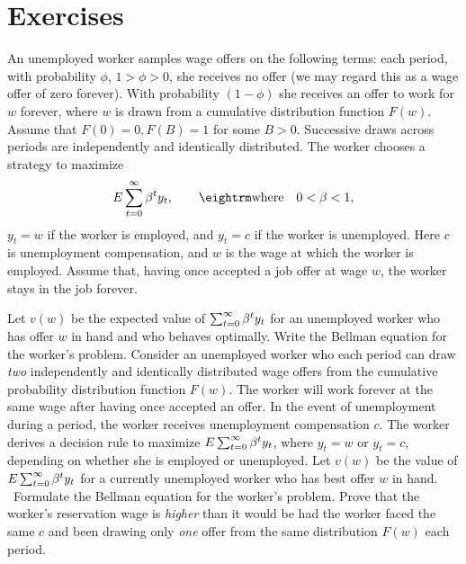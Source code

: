 \showchaptIDfalse
\showsectIDfalse
\section{Exercises}
\showchaptIDtrue
\showsectIDtrue
\medskip
{}
\medskip
\noindent An unemployed worker samples wage offers on the following terms:  each period,
with probability $\phi$, $1>\phi>0$, she receives no offer (we may regard this
as a wage offer of zero forever).  With probability $(1-\phi)$ she receives an
offer to work for $w$ forever, where $w$ is drawn from a cumulative
distribution function $F(w)$. Assume that $F(0) = 0, F(B) =1$ for some $B >0$.   Successive draws across periods are
independently and identically distributed.  The worker chooses a strategy to
maximize
$$E\sum_{t=0}^\infty \be^t y_t,\qquad {\rm where}\quad 0<\be<1,$$
$y_t=w$ if the worker is employed, and $y_t=c$ if the worker is unemployed.
Here $c$ is unemployment compensation, and $w$ is the wage at which the worker
is employed.  Assume that, having once accepted a job offer at wage $w$, the
worker stays in the job forever.

Let $v(w)$ be the expected value of $\sum_{t=0}^\infty{\beta}^t y_t$ for an
unemployed worker who has offer $w$ in hand and who behaves optimally.  Write
the Bellman equation for the worker's problem.
\medskip
{} 
\medskip
\noindent Consider an unemployed worker who each period can draw {\it two\/} independently
and identically distributed wage offers from the cumulative probability
distribution function $F(w)$.  The worker will work forever at the same wage
 after having once accepted an offer.  In the event of unemployment during a
period, the worker receives unemployment compensation $c$.  The
worker derives a decision rule to maximize $E\sum_{t=0}^\infty
{\beta}^t y_t$, where $y_t=w$ or $y_t=c$, depending on whether she is
employed or unemployed.  Let $v(w)$ be the value of $E
\sum_{t=0}^\infty {\beta}^t y_t$ for a currently unemployed worker who
has best offer $w$ in hand.
\medskip{}  \ Formulate the
Bellman equation for the worker's problem.
\medskip{}
 Prove that the worker's reservation wage is {\it higher\/} than it
would be had the worker faced the same $c$ and been drawing only {\it one\/}
offer from the same distribution $F(w)$ each period.

